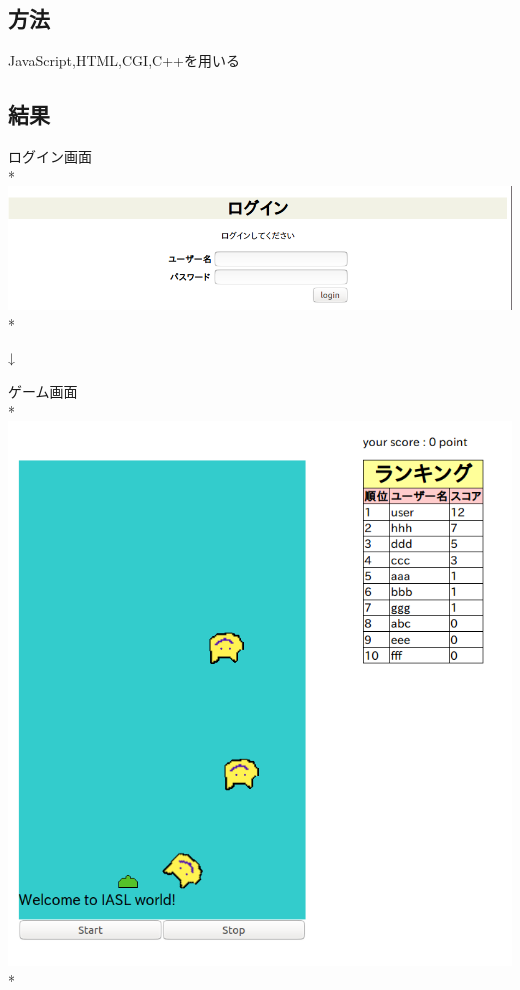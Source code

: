 \documentclass[a4j]{jarticle}
\begin{document}
\subsection{方法}
JavaScript,HTML,CGI,C++を用いる

\subsection{結果}

\begin{center}
ログイン画面\\*
\includegraphics[width=\textwidth]{result/result1.png}\\*

{\LARGE↓}

ゲーム画面\\*
\includegraphics[width=\textwidth]{result/result2.png}\\*
\end{center}
\end{document}
